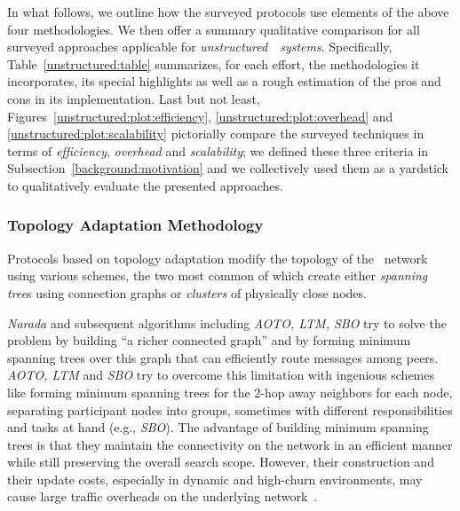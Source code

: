 In what follows, we outline how the surveyed protocols 
use elements of the above four methodologies. 
We then  offer a summary qualitative comparison for all surveyed
approaches applicable for \emph{unstructured}~\p~\emph{systems}.
Specifically, Table~\ref{unstructured:table} summarizes, for each
effort, the methodologies it incorporates, its special highlights as well as 
a rough estimation of the pros and cons in its implementation. 
Last but not least, Figures~\ref{unstructured:plot:efficiency}, \ref{unstructured:plot:overhead}
and \ref{unstructured:plot:scalability} pictorially compare the
surveyed techniques in terms of \emph{efficiency}, \emph{overhead} and \emph{scalability};
we defined these three criteria in Subsection~\ref{background:motivation}
and we collectively used them as a yardstick to qualitatively 
evaluate the presented approaches.

\subsubsection{Topology Adaptation Methodology}

Protocols based on topology adaptation 
modify the topology of the \p\ network
using various schemes, the two most common of which
create either \emph{spanning tree}s using connection graphs
or \emph{clusters} of physically close nodes.

\emph{Narada} and subsequent algorithms including 
\emph{AOTO, LTM, SBO} try to solve the problem
by building ``a richer connected graph'' and by forming 
minimum spanning trees over
this graph that can efficiently route messages among peers. 
\emph{AOTO, LTM} and \emph{SBO} try to
overcome this limitation with ingenious schemes
like forming minimum spanning trees
for the $2$-hop away neighbors for each node, separating participant nodes into
groups, sometimes with different responsibilities and tasks at hand (e.g.,
\emph{SBO}). 
The advantage of building minimum spanning trees is that
they maintain the connectivity on the network in
an efficient manner while still preserving the overall search scope.
However, their construction and their update costs,
especially in dynamic and high-churn environments,
may cause large traffic overheads on the underlying
network~\cite{CRZ2000,CRSZ2001,CRSZ2002}.

